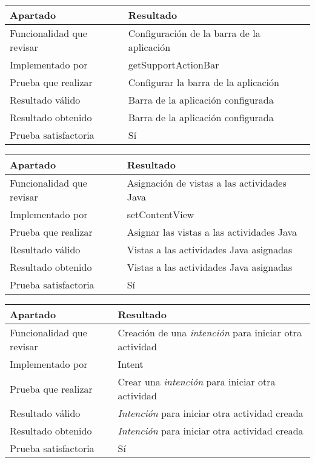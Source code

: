\bigskip

\begin{center}
    \begin{tabulary}{0.8\textwidth}{L|L}
        \textbf{Apartado} & \textbf{Resultado} \\ \hline
        Funcionalidad que revisar & Configuración de la barra de la aplicación \\
        Implementado por & getSupportActionBar \\
        Prueba que realizar & Configurar la barra de la aplicación \\
        Resultado válido & Barra de la aplicación configurada \\
        Resultado obtenido & Barra de la aplicación configurada \\
        Prueba satisfactoria & Sí \\
    \end{tabulary}
\end{center}

\bigskip

\begin{center}
    \begin{tabulary}{0.8\textwidth}{L|L}
        \textbf{Apartado} & \textbf{Resultado} \\ \hline
        Funcionalidad que revisar & Asignación de vistas a las actividades Java \\
        Implementado por & setContentView \\
        Prueba que realizar & Asignar las vistas a las actividades Java \\
        Resultado válido & Vistas a las actividades Java asignadas \\
        Resultado obtenido & Vistas a las actividades Java asignadas \\
        Prueba satisfactoria & Sí \\
    \end{tabulary}
\end{center}

\bigskip

\begin{center}
    \begin{tabulary}{0.8\textwidth}{L|L}
        \textbf{Apartado} & \textbf{Resultado} \\ \hline
        Funcionalidad que revisar & Creación de una \textit{intención} para iniciar otra actividad \\
        Implementado por & Intent \\
        Prueba que realizar & Crear una \textit{intención} para iniciar otra actividad \\
        Resultado válido & \textit{Intención} para iniciar otra actividad creada \\
        Resultado obtenido & \textit{Intención} para iniciar otra actividad creada \\
        Prueba satisfactoria & Sí \\
    \end{tabulary}
\end{center}

